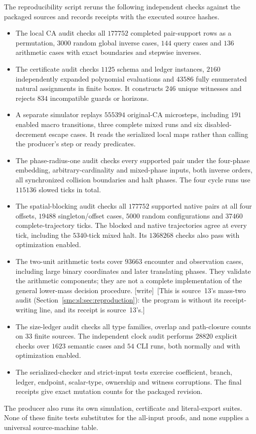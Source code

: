 \documentclass[11pt,letterpaper]{article}
\numberwithin{equation}{section}
\theoremstyle{definition}
\theoremstyle{remark}
\newcommand{\wtag}{\textup{[write]}}
\begin{document}
The reproducibility script reruns the following independent checks against
the packaged sources and records receipts with the executed source hashes.
\begin{itemize}
\item The local CA audit checks all $177752$ completed pair-support rows
as a permutation, $3000$ random global inverse cases, $144$ query cases
and $136$ arithmetic cases with exact boundaries and stepwise inverses.
\item The certificate audit checks $1125$ schema and ledger instances,
$2160$ independently expanded polynomial evaluations and $43586$
fully enumerated natural assignments in finite boxes. It constructs
$246$ unique witnesses and rejects $834$ incompatible guards or horizons.
\item A separate simulator replays $555394$ original-CA microsteps,
including $191$ enabled macro transitions, three complete mixed runs
and six disabled-decrement escape cases. It reads the serialized local
maps rather than calling the producer's step or ready predicates.
\item The phase-radius-one audit checks every supported pair under the
four-phase embedding, arbitrary-cardinality and mixed-phase inputs,
both inverse orders, all synchronized collision boundaries and halt
phases. The four cycle runs use $115136$ slowed ticks in total.
\item The spatial-blocking audit checks all $177752$ supported native pairs at all four offsets, $19488$ singleton/offset cases, $5000$ random configurations and $37460$ complete-trajectory ticks. The blocked and native trajectories agree at every tick, including the $5340$-tick mixed halt. Its $1368268$ checks also pass with optimization enabled.
\item The two-unit arithmetic tests cover $93663$ encounter and observation
cases, including large binary coordinates and later translating phases.
They validate the arithmetic components; they are not a complete
implementation of the general lower-mass decision procedure.
\wtag\ [This is source~13's mass-two audit (Section~\ref{smc:sl:sec:reproduction}): the program is  without its receipt-writing line, and its receipt is source~13's.]
\item The size-ledger audit checks all type families, overlap and path-closure counts on $33$ finite sources. The independent clock audit performs $28820$ explicit checks over $1623$ semantic cases and $54$ CLI runs, both normally and with optimization enabled.
\item The serialized-checker and strict-input tests exercise coefficient,
branch, ledger, endpoint, scalar-type, ownership and witness corruptions.
The final receipts give exact mutation counts for the packaged revision.
\end{itemize}
The producer also runs its own simulation, certificate and literal-export
suites. None of these finite tests substitutes for the all-input proofs,
and none supplies a universal source-machine table.
\end{document}
